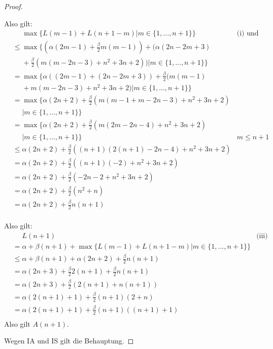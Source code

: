 \documentclass[lang=ngerman, margins=small, extendmath=true]{scrhmwrk}
\begin{document}
\begin{proof}
\begin{indstep*}
Also gilt:
\begin{align*}
& \phantom{{}={}} \max\{L(m-1) + L(n+1-m) | m \in \{1,...,n+1\}\} & \text{(i) und (ii)}\\
& \leq \max \{(\alpha (2m-1) + \frac{\beta}{2} m(m-1)) + (\alpha (2n-2m+3) & \\
& \phantom{{}={}} + \frac{\beta}{2} (m(m-2n-3) +n^2 +3n +2)) | m \in \{1,...,n+1\}\} & \\
& = \max \{\alpha ((2m-1)+(2n-2m+3)) + \frac{\beta}{2} (m(m-1) & \\ 
& \phantom{{}={}} + m(m-2n-3) +n^2 +3n +2) | m \in \{1,...,n+1\}\} & \\
& = \max \{\alpha (2n+2) + \frac{\beta}{2} (m(m-1+m-2n-3) +n^2 +3n +2) & \\ 
& \phantom{{}={}} | m \in \{1,...,n+1\}\} & \\
& = \max \{\alpha (2n+2) + \frac{\beta}{2} (m(2m-2n-4) +n^2 +3n +2) & \\
& \phantom{{}={}} | m \in \{1,...,n+1\}\} & m \leq n+1\\
& \leq \alpha (2n+2) + \frac{\beta}{2} ((n+1)(2(n+1)-2n-4) +n^2 +3n +2) & \\
& = \alpha (2n+2) + \frac{\beta}{2} ((n+1)(-2) +n^2 +3n +2) & \\
& = \alpha (2n+2) + \frac{\beta}{2} (-2n-2 +n^2 +3n +2) & \\
& = \alpha (2n+2) + \frac{\beta}{2} (n^2 +n) & \\
& = \alpha (2n+2) + \frac{\beta}{2} n(n+1) & \tag{iii}\\
\end{align*}

Also gilt:
\begin{align*}
& \phantom{{}={}} L(n+1)   & \text{(iii)} \\
& = \alpha + \beta (n+1) + \max\{L(m-1) + L(n+1-m) | m \in \{1,...,n+1\}\} & \\
& \leq \alpha + \beta (n+1) + \alpha (2n+2) + \frac{\beta}{2} n(n+1) & \\
& = \alpha (2n+3) + \frac{\beta}{2} 2(n+1) + \frac{\beta}{2} n(n+1) & \\
& = \alpha (2n+3) + \frac{\beta}{2} (2(n+1) + n(n+1)) & \\
& = \alpha (2(n+1)+1) + \frac{\beta}{2} (n+1)(2 + n) & \\
& = \alpha (2(n+1)+1) + \frac{\beta}{2} (n+1)((n+1)+1) & \\
\end{align*}
Also gilt $A(n+1)$.
\end{indstep*}

Wegen IA und IS gilt die Behauptung.

\end{proof}
\end{document}
